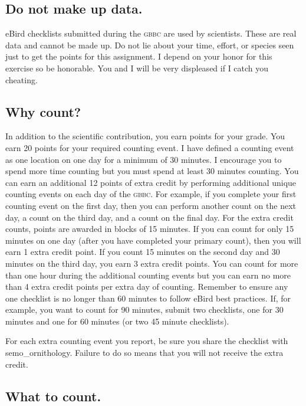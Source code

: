\documentclass[11pt]{article}
\begin{document}
\subsection*{Do not make up data.}

eBird checklists submitted during the \textsc{gbbc} are used by scientists. These are real data and cannot be made up.  Do not lie about your time, effort, or species seen just to get the points for this assignment. I depend on your honor for this exercise so be honorable. You and I will be very displeased if I catch you cheating.

\subsection*{Why count?}
In addition to the scientific contribution, you earn points for your grade. You earn 20 points for your required counting event. I have defined a counting event as one location on one day for a minimum of 30 minutes. I encourage you to spend more time counting but you must spend at least 30 minutes counting.  You can earn an additional 12 points of extra credit by performing additional unique counting events on each day of the \textsc{gbbc}. For example, if you complete your first counting event on the first day, then you can perform another count on the next day, a count on the third day, and a count on the final day.  For the extra credit counts, points are awarded in blocks of 15 minutes. If you can count for only 15 minutes on one day (after you have completed your primary count), then you will earn 1 extra credit point. If you count 15 minutes on the second day and 30 minutes on the third day, you earn 3 extra credit points.  You can count for more than one hour during the additional counting events but you can earn no more than 4 extra credit points per extra day of counting.  Remember to ensure any one checklist is no longer than 60 minutes to follow eBird best practices. If, for example, you want to count for 90 minutes, submit two checklists, one for 30 minutes and one for 60 minutes (or two 45 minute checklists).

For each extra counting event you report, be sure you share the checklist with semo\_ornithology. Failure to do so means that you will not receive the extra credit.

\subsection*{What to count.}
\end{document}
